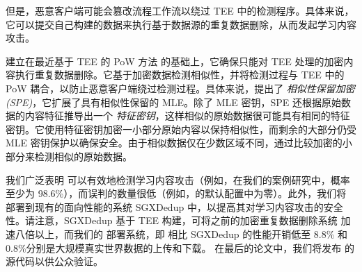 但是，恶意客户端可能会篡改流程工作流以绕过 TEE 中的检测程序。具体来说，它可以提交自己构建的数据来执行基于数据源的重复数据删除，从而发起学习内容攻击。

\sysnameF 建立在最近基于 TEE 的 PoW 方法 \cite{ren21} 的基础上，它确保只能对 TEE 处理的加密内容执行重复数据删除。它基于加密数据检测相似性，并将检测过程与 TEE 中的 PoW 耦合，以防止恶意客户端绕过检测过程。具体来说，\sysnameF 提出了 {\em 相似性保留加密 (SPE)}，它扩展了具有相似性保留的 MLE。除了 MLE 密钥，SPE 还根据原始数据的内容特征推导出一个 {\em 特征密钥}，这样相似的原始数据很可能具有相同的特征密钥。它使用特征密钥加密一小部分原始内容以保持相似性，而剩余的大部分仍受 MLE 密钥保护以确保安全。由于相似数据仅在少数区域不同，\sysnameF 通过比较加密的小部分来检测相似的原始数据。


我们广泛表明 \sysnameF 可以有效地检测学习内容攻击（例如，在我们的案例研究中，概率至少为 98.6\%），而误判的数量很低（例如，\sysnameF 的默认配置中为零）。此外，我们将 \sysnameF 部署到现有的面向性能的系统 SGXDedup \cite{ren21} 中，以提高其对学习内容攻击的安全性。请注意，SGXDedup 基于 TEE 构建，可将之前的加密重复数据删除系统 \cite{bellare13b} 加速八倍以上，而我们的 \sysnameF 部署系统，即 \prototype 相比 SGXDedup 的性能开销低至 8.8\% 和 0.8\%分别是大规模真实世界数据的上传和下载。
在最后的论文中，我们将发布 \prototype 的源代码以供公众验证。